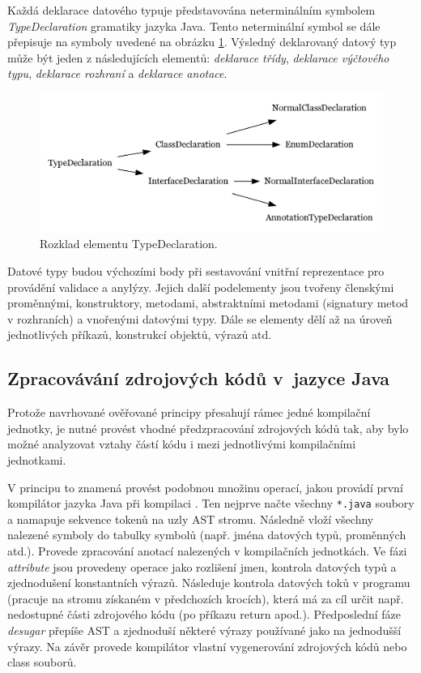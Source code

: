 Každá deklarace datového typuje představována neterminálním symbolem \emph{TypeDeclaration} gramatiky jazyka Java. Tento neterminální symbol se dále přepisuje na symboly uvedené na obrázku \ref{type_declaration_options}. Výsledný deklarovaný datový typ může být jeden z následujících elementů: \emph{deklarace třídy}, \emph{deklarace výčtového typu}, \emph{deklarace rozhraní} a \emph{deklarace anotace}.

\begin{figure}[h!]
  \centering
  \includegraphics[width=\textwidth]{./graphs/toplevel_types.png}
  \caption{Rozklad elementu TypeDeclaration.\label{type_declaration_options}}
\end{figure}

Datové typy budou výchozími body při sestavování vnitřní reprezentace pro provádění validace a anylýzy. Jejich další podelementy jsou tvořeny členskými proměnnými, konstruktory, metodami, abstraktními metodami (signatury metod v rozhraních) a vnořenými datovými typy. Dále se elementy dělí až na úroveň jednotlivých příkazů, konstrukcí objektů, výrazů atd.

\subsection{Zpracovávání zdrojových kódů v~jazyce Java}
Protože navrhované ověřované principy přesahují rámec jedné kompilační jednotky, je nutné provést vhodné předzpracování zdrojových kódů tak, aby bylo možné analyzovat vztahy částí kódu i mezi jednotlivými kompilačními jednotkami.

V principu to znamená provést podobnou množinu operací, jakou provádí první kompilátor jazyka Java při kompilaci \cite{hackers_guide_to_javac}. Ten nejprve načte všechny \verb+*.java+ soubory a namapuje sekvence tokenů na uzly AST stromu. Následně vloží všechny nalezené symboly do tabulky symbolů (např. jména datových typů, proměnných atd.). Provede zpracování anotací nalezených v kompilačních jednotkách. Ve fázi \emph{attribute} jsou provedeny operace jako rozlišení jmen, kontrola datových typů a zjednodušení konstantních výrazů. Následuje kontrola datových toků v programu (pracuje na stromu získaném v předchozích krocích), která má za cíl určit např. nedostupné části zdrojového kódu (po příkazu return apod.). Předposlední fáze \emph{desugar} přepíše AST a zjednoduší některé výrazy používané jako  na jednodušší výrazy. Na závěr provede kompilátor vlastní vygenerování zdrojových kódů nebo class souborů.

